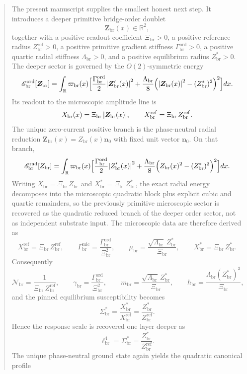 \documentclass[11pt]{article}
\newcommand{\CurvScale}{\ell_{\mathrm{br}}}
\newcommand{\ProfWeight}{\varpi_{\mathrm{br}}}
\newcommand{\RespSusEq}{\Sigma_{\mathrm{br}}^{\ast}}
\newcommand{\RespNorm}{\mathcal N_{\mathrm{br}}}
\newcommand{\RespFluxCoeff}{\gamma_{\mathrm{br}}}
\newcommand{\RespGap}{m_{\mathrm{br}}}
\newcommand{\RespBias}{h_{\mathrm{br}}}
\newcommand{\RespMicro}{X_{\mathrm{br}}}
\newcommand{\RespMicroEq}{X_{\mathrm{br}}^{\ast}}
\newcommand{\RespMicroRef}{X_{\mathrm{br}}^{\mathrm{ref}}}
\newcommand{\RespMicroFluxCoeff}{\Gamma_{\mathrm{br}}^{\mathrm{mic}}}
\newcommand{\RespMicroGap}{\mu_{\mathrm{br}}}
\newcommand{\RespOrderField}{\bm Z_{\mathrm{br}}}
\newcommand{\RespOrderAmp}{Z_{\mathrm{br}}}
\newcommand{\RespOrderRef}{Z_{\mathrm{br}}^{\mathrm{ref}}}
\newcommand{\RespOrderEq}{Z_{\mathrm{br}}^{\ast}}
\newcommand{\RespOrderReadout}{\Xi_{\mathrm{br}}}
\newcommand{\RespOrderStiff}{\Gamma_{\mathrm{br}}^{\mathrm{ord}}}
\newcommand{\RespOrderQuartic}{\Lambda_{\mathrm{br}}}
\newcommand{\RespOrderEnergy}{\mathscr E_{\mathrm{br}}^{\mathrm{ord}}}
\newcommand{\RespOrderRadEnergy}{\mathscr E_{\mathrm{br}}^{\mathrm{rad}}}
\newcommand{\RespOrderDir}{\bm n_0}
\begin{document}
\begin{abstract}
The present manuscript supplies the smallest honest next step. It introduces a deeper primitive bridge-order doublet
\[
\RespOrderField(x)\in\mathbb R^2,
\]
together with a positive readout coefficient \(\RespOrderReadout>0\), a positive reference radius \(\RespOrderRef>0\), a positive primitive gradient stiffness \(\RespOrderStiff>0\), a positive quartic radial stiffness \(\RespOrderQuartic>0\), and a positive equilibrium radius \(\RespOrderEq>0\). The deeper sector is governed by the \(O(2)\)-symmetric energy
\[
\RespOrderEnergy[\RespOrderField]
=
\int_{\mathbb R}\ProfWeight(x)\Bigl[
\frac{\RespOrderStiff}{2}\abs{\RespOrderField'(x)}^2
+
\frac{\RespOrderQuartic}{8}\Bigl(\abs{\RespOrderField(x)}^2-(\RespOrderEq)^2\Bigr)^2
\Bigr]dx.
\]
Its readout to the microscopic amplitude line is
\[
\RespMicro(x)=\RespOrderReadout\,\abs{\RespOrderField(x)},
\qquad
\RespMicroRef=\RespOrderReadout\,\RespOrderRef.
\]
The unique zero-current positive branch is the phase-neutral radial reduction \(\RespOrderField(x)=\RespOrderAmp(x)\RespOrderDir\) with fixed unit vector \(\RespOrderDir\). On that branch,
\[
\RespOrderRadEnergy[\RespOrderAmp]
=
\int_{\mathbb R}\ProfWeight(x)\Bigl[
\frac{\RespOrderStiff}{2}\abs{\RespOrderAmp'(x)}^2
+
\frac{\RespOrderQuartic}{8}\Bigl(\RespOrderAmp(x)^2-(\RespOrderEq)^2\Bigr)^2
\Bigr]dx.
\]
Writing \(\RespMicro=\RespOrderReadout\,\RespOrderAmp\) and \(\RespMicroEq=\RespOrderReadout\,\RespOrderEq\), the exact radial energy decomposes into the microscopic quadratic block plus explicit cubic and quartic remainders, so the previously primitive microscopic sector is recovered as the quadratic reduced branch of the deeper order sector, not as independent substrate input. The microscopic data are therefore derived as
\[
\RespMicroRef=\RespOrderReadout\,\RespOrderRef,
\qquad
\RespMicroFluxCoeff=\frac{\RespOrderStiff}{\RespOrderReadout^2},
\qquad
\RespMicroGap=\frac{\sqrt{\RespOrderQuartic}\,\RespOrderEq}{\RespOrderReadout},
\qquad
\RespMicroEq=\RespOrderReadout\,\RespOrderEq.
\]
Consequently
\[
\RespNorm=\frac{1}{\RespOrderReadout\,\RespOrderRef},
\qquad
\RespFluxCoeff=\frac{\RespOrderStiff}{\RespOrderReadout^2},
\qquad
\RespGap=\frac{\sqrt{\RespOrderQuartic}\,\RespOrderEq}{\RespOrderReadout},
\qquad
\RespBias=\frac{\RespOrderQuartic(\RespOrderEq)^3}{\RespOrderReadout},
\]
and the pinned equilibrium susceptibility becomes
\[
\RespSusEq=\frac{\RespMicroEq}{\RespMicroRef}=\frac{\RespOrderEq}{\RespOrderRef}.
\]
Hence the response scale is recovered one layer deeper as
\[
\CurvScale^4=\RespSusEq=\frac{\RespOrderEq}{\RespOrderRef}.
\]
The unique phase-neutral ground state again yields the quadratic canonical profile

\end{abstract}
\end{document}
